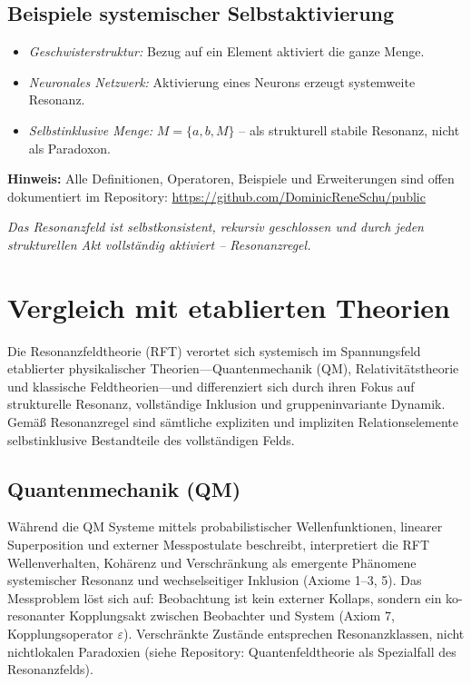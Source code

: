 \documentclass[12pt]{iopart}
\begin{document}
\subsection{Beispiele systemischer Selbstaktivierung}

\begin{itemize}
	\item \textit{Geschwisterstruktur:} Bezug auf ein Element aktiviert die ganze Menge.
	\item \textit{Neuronales Netzwerk:} Aktivierung eines Neurons erzeugt systemweite Resonanz.
	\item \textit{Selbstinklusive Menge:} $M = \{a, b, M\}$ – als strukturell stabile Resonanz, nicht als Paradoxon.
\end{itemize}

\medskip

\noindent\textbf{Hinweis:}  
Alle Definitionen, Operatoren, Beispiele und Erweiterungen sind offen dokumentiert im Repository:  
\url{https://github.com/DominicReneSchu/public}

\medskip

\noindent\textit{Das Resonanzfeld ist selbstkonsistent, rekursiv geschlossen und durch jeden strukturellen Akt vollständig aktiviert – Resonanzregel.}
	
\section{Vergleich mit etablierten Theorien}

Die Resonanzfeldtheorie (RFT) verortet sich systemisch im Spannungsfeld etablierter physikalischer Theorien—Quantenmechanik (QM), Relativitätstheorie und klassische Feldtheorien—und differenziert sich durch ihren Fokus auf strukturelle Resonanz, vollständige Inklusion und gruppeninvariante Dynamik. Gemäß Resonanzregel sind sämtliche expliziten und impliziten Relationselemente selbstinklusive Bestandteile des vollständigen Felds.

\subsection{Quantenmechanik (QM)}

Während die QM Systeme mittels probabilistischer Wellenfunktionen, linearer Superposition und externer Messpostulate beschreibt, interpretiert die RFT Wellenverhalten, Kohärenz und Verschränkung als emergente Phänomene systemischer Resonanz und wechselseitiger Inklusion (Axiome 1–3, 5). Das Messproblem löst sich auf: Beobachtung ist kein externer Kollaps, sondern ein ko-resonanter Kopplungsakt zwischen Beobachter und System (Axiom 7, Kopplungsoperator $\varepsilon$). Verschränkte Zustände entsprechen Resonanzklassen, nicht nichtlokalen Paradoxien (siehe Repository: Quantenfeldtheorie als Spezialfall des Resonanzfelds).
\end{document}
